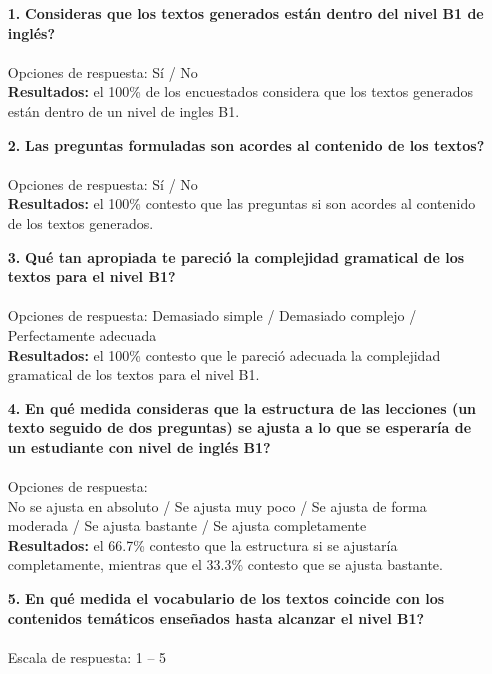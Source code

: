\begin{enumerate}
\item[\textbf{1.}] \textbf{\textquestiondown Consideras que los textos generados están dentro del nivel B1 de inglés?}\\\\
Opciones de respuesta: Sí / No\\

\textbf{Resultados: } el 100\% de los encuestados considera que los textos generados están dentro de un nivel de ingles B1.
\\

\item[\textbf{2.}] \textbf{\textquestiondown Las preguntas formuladas son acordes al contenido de los textos?}\\\\
Opciones de respuesta: Sí / No\\

\textbf{Resultados: } el 100\% contesto que las preguntas si son acordes al contenido de los textos generados.
\newpage
\item[\textbf{3.}] \textbf{\textquestiondown Qué tan apropiada te pareció la complejidad gramatical de los textos para el nivel B1?}\\\\
Opciones de respuesta: Demasiado simple / Demasiado complejo / Perfectamente adecuada\\

\textbf{Resultados: } el 100\% contesto que le pareció adecuada la complejidad gramatical de los textos para el nivel B1.
\\

\item[\textbf{4.}] \textbf{\textquestiondown En qué medida consideras que la estructura de las lecciones (un texto seguido de dos preguntas) se ajusta a lo que se esperaría de un estudiante con nivel de inglés B1?}\\\\
Opciones de respuesta: \\
No se ajusta en absoluto / Se ajusta muy poco / Se ajusta de forma moderada / Se ajusta bastante / Se ajusta completamente\\

\textbf{Resultados: } el 66.7\% contesto que la estructura si se ajustaría completamente, mientras que el 33.3\% contesto que se ajusta bastante.
\\

\item[\textbf{5.}] \textbf{\textquestiondown En qué medida el vocabulario de los textos coincide con los contenidos temáticos enseñados hasta alcanzar el nivel B1?}\\\\
Escala de respuesta: 1 -- 5\\


\end{enumerate}
